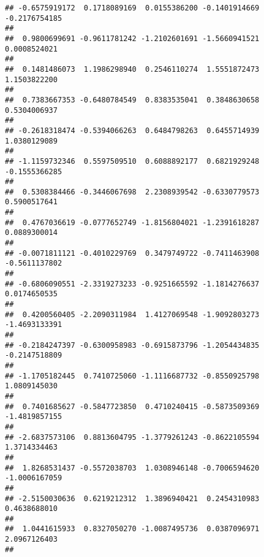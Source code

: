\documentclass[]{article}
\begin{document}
\begin{verbatim}
## -0.6575919172  0.1718089169  0.0155386200 -0.1401914669 -0.2176754185 
##                                                                       
##  0.9800699691 -0.9611781242 -1.2102601691 -1.5660941521  0.0008524021 
##                                                                       
##  0.1481486073  1.1986298940  0.2546110274  1.5551872473  1.1503822200 
##                                                                       
##  0.7383667353 -0.6480784549  0.8383535041  0.3848630658  0.5304006937 
##                                                                       
## -0.2618318474 -0.5394066263  0.6484798263  0.6455714939  1.0380129089 
##                                                                       
## -1.1159732346  0.5597509510  0.6088892177  0.6821929248 -0.1555366285 
##                                                                       
##  0.5308384466 -0.3446067698  2.2308939542 -0.6330779573  0.5900517641 
##                                                                       
##  0.4767036619 -0.0777652749 -1.8156804021 -1.2391618287  0.0889300014 
##                                                                       
## -0.0071811121 -0.4010229769  0.3479749722 -0.7411463908 -0.5611137802 
##                                                                       
## -0.6806090551 -2.3319273233 -0.9251665592 -1.1814276637  0.0174650535 
##                                                                       
##  0.4200560405 -2.2090311984  1.4127069548 -1.9092803273 -1.4693133391 
##                                                                       
## -0.2184247397 -0.6300958983 -0.6915873796 -1.2054434835 -0.2147518809 
##                                                                       
## -1.1705182445  0.7410725060 -1.1116687732 -0.8550925798  1.0809145030 
##                                                                       
##  0.7401685627 -0.5847723850  0.4710240415 -0.5873509369 -1.4819857155 
##                                                                       
## -2.6837573106  0.8813604795 -1.3779261243 -0.8622105594  1.3714334463 
##                                                                       
##  1.8268531437 -0.5572038703  1.0308946148 -0.7006594620 -1.0006167059 
##                                                                       
## -2.5150030636  0.6219212312  1.3896940421  0.2454310983  0.4638688010 
##                                                                       
##  1.0441615933  0.8327050270 -1.0087495736  0.0387096971  2.0967126403 
##                                                                       

\end{verbatim}
\end{document}
